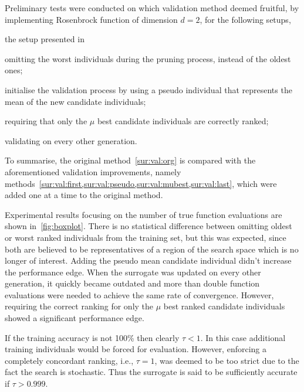 Preliminary tests were conducted on which validation method deemed fruitful, by implementing  Rosenbrock function of dimension $d=2$, for the following setups, 
\begin{inparaenum}[{Method} (i)]
 \item the setup presented in \cite{Ru06:PPSN} %
 \item omitting the worst individuals during the pruning process, instead of the oldest ones; \label{sur:val:first}
 \item initialise the validation process by using a pseudo individual that represents the mean of the new candidate individuals; \label{sur:val:pseudo}
 \item requiring that only the $\mu$ best candidate individuals are correctly ranked; \label{sur:val:mubest}
\item validating on every other generation. \label{sur:val:last}
\end{inparaenum}
To summarise, the original method~\cref{sur:val:org} is compared with the aforementioned validation improvements, namely methods~\cref{sur:val:first,sur:val:pseudo,sur:val:mubest,sur:val:last}, which were added one at a time to the original method. 


Experimental results focusing on the number of true function evaluations are shown in~\cref{fig:boxplot}. There is no statistical difference between omitting oldest or worst ranked individuals  from the training set, but this was expected, since both are believed to be representatives of a region of the search space which is no longer of interest. Adding the pseudo mean candidate individual didn't increase the performance edge. When the surrogate was updated on every other generation, it quickly became outdated and more than double function evaluations were needed to achieve the same rate of convergence. 
However, requiring the correct ranking for only the $\mu$ best ranked candidate individuals showed a significant performance edge. 

If the training accuracy is not 100\% then clearly $\tau < 1$. In this case additional training individuals  would be forced for evaluation. However, enforcing a completely concordant ranking, i.e.,  $\tau=1$, was deemed to be too strict due to the fact the search is stochastic. Thus the surrogate is said to be sufficiently accurate if $\tau>0.999$. 


